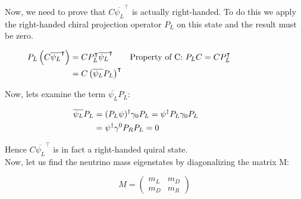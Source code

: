Now, we need to prove that $C \overline{\psi_L}^\intercal$ is actually right-handed. To do this we apply the right-handed chiral projection operator $P_L$ on this state and
the result must be zero.

\begin{align}
  &\begin{aligned}
     \mathllap{P_L \left( C \overline{\psi_L}^\intercal \right)} &= C P_L^\intercal \overline{\psi_L}^\intercal &\text{Property of C: $P_LC = C P_L^\intercal$}\\        
     \mathllap{} &= C \left( \overline{\psi_L}P_L \right)^\intercal  
  &\end{aligned}
\end{align}

Now, lets examine the term $\overline{\psi_L}P_L$:
 

\begin{align}
  &\begin{aligned}
    \mathllap{\overline{\psi_L}P_L} &= (P_L \psi)^\dagger \gamma_0 P_L = \psi^\dagger P_L \gamma_0 P_L\\
    \mathllap{} &= \psi^\dagger \gamma^0 P_R P_L = 0
    &\end{aligned}
\end{align}

Hence $C \overline{\psi_L}^\intercal$ is in fact a right-handed quiral state. 
\\
Now, let us find the neutrino mass eigenstates by diagonalizing the matrix M:

\begin{equation}\label{matrix m}
M = 
\begin{pmatrix}
  m_L & m_D \\
  m_D & m_R  
\end{pmatrix}
\end{equation}




